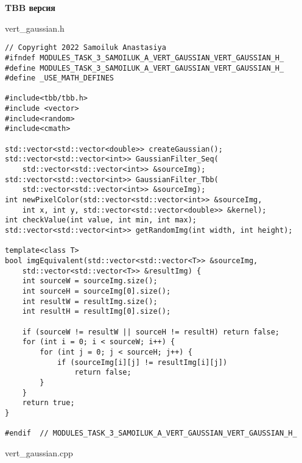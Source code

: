 \documentclass{report}
\begin{document}
\textbf{TBB версия}
\par vert\_gaussian.h
\begin{lstlisting}
// Copyright 2022 Samoiluk Anastasiya
#ifndef MODULES_TASK_3_SAMOILUK_A_VERT_GAUSSIAN_VERT_GAUSSIAN_H_
#define MODULES_TASK_3_SAMOILUK_A_VERT_GAUSSIAN_VERT_GAUSSIAN_H_
#define _USE_MATH_DEFINES

#include<tbb/tbb.h>
#include <vector>
#include<random>
#include<cmath>

std::vector<std::vector<double>> createGaussian();
std::vector<std::vector<int>> GaussianFilter_Seq(
    std::vector<std::vector<int>> &sourceImg);
std::vector<std::vector<int>> GaussianFilter_Tbb(
    std::vector<std::vector<int>> &sourceImg);
int newPixelColor(std::vector<std::vector<int>> &sourceImg,
    int x, int y, std::vector<std::vector<double>> &kernel);
int checkValue(int value, int min, int max);
std::vector<std::vector<int>> getRandomImg(int width, int height);

template<class T>
bool imgEquivalent(std::vector<std::vector<T>> &sourceImg,
    std::vector<std::vector<T>> &resultImg) {
    int sourceW = sourceImg.size();
    int sourceH = sourceImg[0].size();
    int resultW = resultImg.size();
    int resultH = resultImg[0].size();

    if (sourceW != resultW || sourceH != resultH) return false;
    for (int i = 0; i < sourceW; i++) {
        for (int j = 0; j < sourceH; j++) {
            if (sourceImg[i][j] != resultImg[i][j])
                return false;
        }
    }
    return true;
}

#endif  // MODULES_TASK_3_SAMOILUK_A_VERT_GAUSSIAN_VERT_GAUSSIAN_H_
\end{lstlisting}
\par vert\_gaussian.cpp
\end{document}
